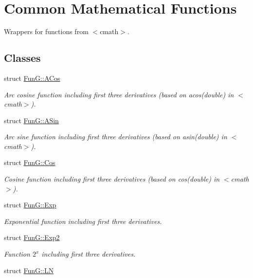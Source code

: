 \hypertarget{group__CMathGroup}{\section{\-Common \-Mathematical \-Functions}
\label{group__CMathGroup}
}


\-Wrappers for functions from $<$cmath$>$.  


\subsection*{\-Classes}
\begin{DoxyCompactItemize}
\item 
struct \hyperlink{structFunG_1_1ACos}{\-Fun\-G\-::\-A\-Cos}
\begin{DoxyCompactList}\small\item\em \-Arc cosine function including first three derivatives (based on acos(double) in $<$cmath$>$). \end{DoxyCompactList}\item 
struct \hyperlink{structFunG_1_1ASin}{\-Fun\-G\-::\-A\-Sin}
\begin{DoxyCompactList}\small\item\em \-Arc sine function including first three derivatives (based on asin(double) in $<$cmath$>$). \end{DoxyCompactList}\item 
struct \hyperlink{structFunG_1_1Cos}{\-Fun\-G\-::\-Cos}
\begin{DoxyCompactList}\small\item\em \-Cosine function including first three derivatives (based on cos(double) in $<$cmath$>$). \end{DoxyCompactList}\item 
struct \hyperlink{structFunG_1_1Exp}{\-Fun\-G\-::\-Exp}
\begin{DoxyCompactList}\small\item\em \-Exponential function including first three derivatives. \end{DoxyCompactList}\item 
struct \hyperlink{structFunG_1_1Exp2}{\-Fun\-G\-::\-Exp2}
\begin{DoxyCompactList}\small\item\em \-Function $2^x$ including first three derivatives. \end{DoxyCompactList}\item 
struct \hyperlink{structFunG_1_1LN}{\-Fun\-G\-::\-L\-N}

\end{DoxyCompactItemize}
